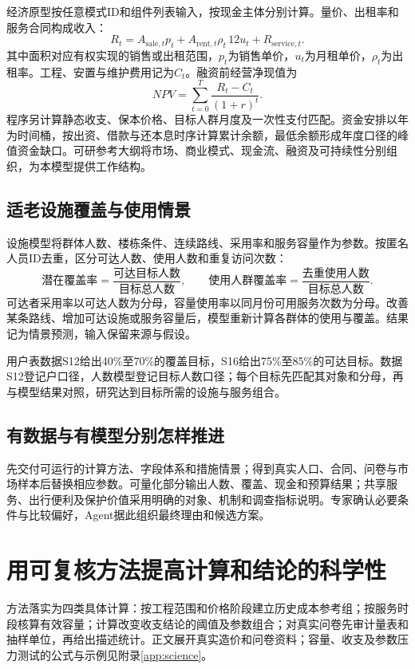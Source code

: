 \documentclass[UTF8,11pt,fontset=windows]{ctexart}
\begin{document}
经济原型按任意模式ID和组件列表输入，按现金主体分别计算。量价、出租率和服务合同构成收入：
\[
R_t=A_{\mathrm{sale},t}p_t+A_{\mathrm{rent},t}\rho_t\,12u_t+R_{\mathrm{service},t}.
\]
其中面积对应有权实现的销售或出租范围，$p_t$为销售单价，$u_t$为月租单价，$\rho_t$为出租率。工程、安置与维护费用记为$C_t$。融资前经营净现值为
\[
NPV=\sum_{t=0}^{T}\frac{R_t-C_t}{(1+r)^t}.
\]
程序另计算静态收支、保本价格、目标人群月度及一次性支付匹配。资金安排以年为时间桶，按出资、借款与还本息时序计算累计余额，最低余额形成年度口径的峰值资金缺口。可研参考大纲将市场、商业模式、现金流、融资及可持续性分别组织，为本模型提供工作结构。\cite{ndrcfinance}

\subsection{适老设施覆盖与使用情景}

设施模型将群体人数、楼栋条件、连续路线、采用率和服务容量作为参数。按匿名人员ID去重，区分可达人数、使用人数和重复访问次数：
\[
\text{潜在覆盖率}=\frac{\text{可达目标人数}}{\text{目标总人数}},\qquad
\text{使用人群覆盖率}=\frac{\text{去重使用人数}}{\text{目标总人数}}.
\]
可达者采用率以可达人数为分母，容量使用率以同月份可用服务次数为分母。改善某条路线、增加可达设施或服务容量后，模型重新计算各群体的使用与覆盖。结果记为情景预测，输入保留来源与假设。

用户表数据S12给出40\%至70\%的覆盖目标，S16给出75\%至85\%的可达目标。数据S12登记户口径，人数模型登记目标人数口径；每个目标先匹配其对象和分母，再与模型结果对照，研究达到目标所需的设施与服务组合。

\subsection{有数据与有模型分别怎样推进}

先交付可运行的计算方法、字段体系和措施情景；得到真实人口、合同、问卷与市场样本后替换相应参数。可量化部分输出人数、覆盖、现金和预算结果；共享服务、出行便利及保护价值采用明确的对象、机制和调查指标说明。专家确认必要条件与比较偏好，Agent据此组织最终理由和候选方案。


\section{用可复核方法提高计算和结论的科学性}

方法落实为四类具体计算：按工程范围和价格阶段建立历史成本参考组；按服务时段核算有效容量；计算改变收支结论的阈值及参数组合；对真实问卷先审计量表和抽样单位，再给出描述统计。正文展开真实造价和问卷资料；容量、收支及参数压力测试的公式与示例见附录\ref{app:science}。
\end{document}
